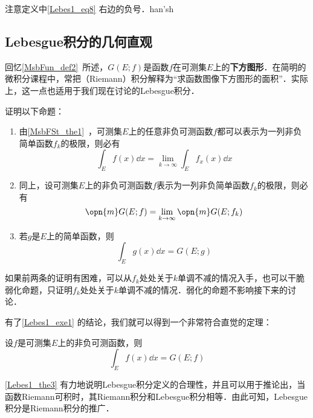 注意定义中\autoref{Lebes1_eq8} 右边的负号．han'sh














\subsection{Lebesgue积分的几何直观}


回忆\autoref{MsbFun_def2}~所述，$G(E; f)$是函数$f$在可测集$E$上的\textbf{下方图形}．在简明的微积分课程中，常把（Riemann）积分解释为“求函数图像下方图形的面积”．实际上，这一点也适用于我们现在讨论的Lebesgue积分．

\begin{exercise}{}\label{Lebes1_exe1}
证明以下命题：

\begin{enumerate}
\item 由\autoref{MsbFSt_the1}~，可测集$E$上的任意非负可测函数$f$都可以表示为一列非负简单函数$f_k$的极限，则必有
\begin{equation}
\int_E f(x) \dd x = \lim\limits_{k\to\infty} \int_{E} f_x(x) \dd x
\end{equation}
\item 同上，设可测集$E$上的非负可测函数$f$表示为一列非负简单函数$f_k$的极限，则必有
\begin{equation}
\opn{m}G(E; f)=\lim\limits_{k\to \infty} \opn{m}G(E; f_k)
\end{equation}
\item 若$g$是$E$上的简单函数，则
\begin{equation}
\int_E g(x) \dd x = G(E; g)
\end{equation}
\end{enumerate}

如果前两条的证明有困难，可以从$f_k$处处关于$k$单调不减的情况入手，也可以干脆弱化命题，只证明$f_k$处处关于$k$单调不减的情况．弱化的命题不影响接下来的讨论．
\end{exercise}

有了\autoref{Lebes1_exe1} 的结论，我们就可以得到一个非常符合直觉的定理：

\begin{theorem}{}\label{Lebes1_the3}
设$f$是可测集$E$上的非负可测函数，则
\begin{equation}
\int_E f(x) \dd x = G(E; f)
\end{equation}
\end{theorem}

\autoref{Lebes1_the3} 有力地说明Lebesgue积分定义的合理性，并且可以用于推论出，当函数Riemann可积时，其Riemann积分和Lebesgue积分相等．由此可知，Lebesgue积分是Riemann积分的推广．













